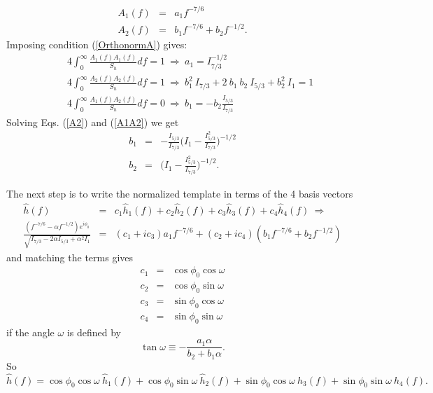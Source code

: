 \begin{eqnarray}
A_1(f) &=& a_1 f^{-7/6} \\
A_2(f) &=& b_1 f^{-7/6} + b_2 f^{-1/2}.
\end{eqnarray}
Imposing condition (\ref{OrthonormA}) gives:
\begin{eqnarray}
\label{A1}
&& 4 \int_0^{\infty} \frac{A_1(f) A_1(f)}{S_h} df = 1 \: \Rightarrow \:
	a_1 = I_{7/3}^{-1/2} \\ 
\label{A2}
&& 4 \int_0^{\infty} \frac{A_2(f) A_2(f)}{S_h} df = 1 \: \Rightarrow \:
	b_1^2\: I_{7/3} + 2\: b_1\: b_2 \: I_{5/3} + 
	b_2^2 \: I_1 = 1 \\
\label{A1A2}
&& 4 \int_0^{\infty} \frac{A_1(f) A_2(f)}{S_h} df = 0 \: \Rightarrow \:
	b_1 = - b_2 \frac{I_{5/3}}{I_{7/3}} 
\end{eqnarray}
Solving Eqs. (\ref{A2}) and (\ref{A1A2}) we get
\begin{eqnarray}
b_1 &=& - \frac{I_{5/3}}{I_{7/3}} \Big ( I_1 - \frac{I_{5/3}^2}{I_{7/3}}  
	\Big )^{-1/2} \\
b_2 &=& \Big ( I_1 - \frac{I_{5/3}^2}{I_{7/3}} \Big )^{-1/2}.
\end{eqnarray}

The next step is to write the normalized template in terms of the 4 basis 
vectors
\begin{eqnarray}
\hat{h}(f) &=& c_1 \hat{h}_1(f) + c_2 \hat{h}_2(f) + c_3 \hat{h}_3(f) +
	c_4 \hat{h}_4(f) \: \Rightarrow \\
\frac{(f^{-7/6} - \alpha f^{-1/2}) e^{i \phi_0}}{\sqrt{I_{7/3} - 2 \alpha 
	I_{5/3} + \alpha^2 I_1}} &=& (c_1 +i c_3) a_1 f^{-7/6} +  
	(c_2 + i c_4) (b_1 f^{-7/6} + b_2 f^{-1/2} )
\end{eqnarray}
and matching the terms gives
\begin{eqnarray}
c_1 &=& \cos\phi_0 \cos\omega \\
c_2 &=& \cos\phi_0 \sin\omega \\
c_3 &=& \sin\phi_0 \cos\omega \\
c_4 &=& \sin\phi_0 \sin\omega
\end{eqnarray}
if the angle $\omega$ is defined by
\begin{equation}
\tan\omega \equiv - \frac{a_1 \alpha}{b_2 + b_1 \alpha}.
\end{equation}
So
\begin{equation}
\hat{h}(f) = \cos\phi_0 \cos\omega \:\hat{h}_1(f) + 
	     \cos\phi_0 \sin\omega \:\hat{h}_2(f) + 
	     \sin\phi_0 \cos\omega \:\hat{h}_3(f) +
	     \sin\phi_0 \sin\omega \:\hat{h}_4(f).
\end{equation}

